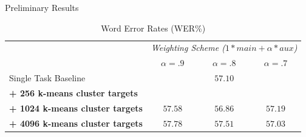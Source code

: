 \documentclass[final]{beamer} %
\begin{document}
\begin{frame}
\begin{columns}
\begin{column}{0.22\textwidth}
{        
        \vspace{.5cm}

                \begin{block}{\boxnumber Preliminary Results}
          \begin{table}[!htbp]
            \centering
            \caption{Word Error Rates (WER\%)}
            \label{tab:results}
            \begin{adjustbox}{width=.9\textwidth}
              \begin{tabular}{lccc}
                \toprule
                & \multicolumn{3}{c}{ \textit{Weighting Scheme ($1*main + \alpha*aux$)}}\\
                & $\alpha = .9 $ & $\alpha = .8 $ & $\alpha = .7 $\\
                \midrule
                Single Task Baseline  &  \multicolumn{3}{c}{$57.10 $ \raisebox{.33\height}{\footnotesize{$\pm 3.25$}}}     \\
                \textbf{+ 256 k-means cluster targets}  &  $ $ \raisebox{.33\height}{\footnotesize{$\pm $}}   &  $ $ \raisebox{.33\height}{\footnotesize{$\pm $}}     & $ $ \raisebox{.33\height}{\footnotesize{$\pm $}} \\
                \textbf{+ 1024 k-means cluster targets}   & $ 57.58$ \raisebox{.33\height}{\footnotesize{$\pm 2.68$}}    & $ 56.86$ \raisebox{.33\height}{\footnotesize{$\pm 1.11$}}    & $57.19  $ \raisebox{.33\height}{\footnotesize{$\pm 1.31$}}  \\
                \textbf{+ 4096 k-means cluster targets}   &  $57.78 $ \raisebox{.33\height}{\footnotesize{$\pm 2.36$}}  & $ 57.51$ \raisebox{.33\height}{\footnotesize{$\pm  2.65$}}   &   $ 57.03$ \raisebox{.33\height}{\footnotesize{$\pm 1.48$}}  \\
                \midrule
                \bottomrule
              \end{tabular}
            \end{adjustbox}
          \end{table}
        \end{block}        

        \vspace{.5cm}


}
\end{column}
\end{columns}
\end{frame}
\end{document}
